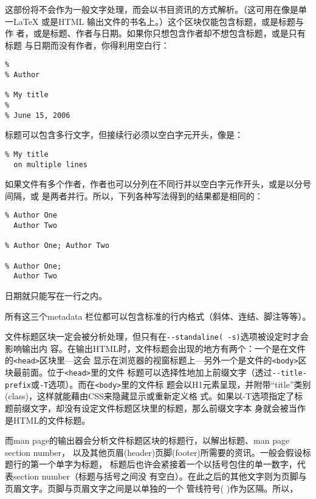\documentclass[cn]{elegantbook}
\newcommand{\passthrough}[1]{#1}
\begin{document}
这部份将不会作为一般文字处理，而会以书目资讯的方式解析。（这可用在像是单
一LaTeX 或是HTML 输出文件的书名上。）这个区块仅能包含标题，或是标题与作
者，或是标题、作者与日期。如果你只想包含作者却不想包含标题，或是只有标题
与日期而没有作者，你得利用空白行：

\begin{lstlisting}
%
% Author

% My title
%
% June 15, 2006
\end{lstlisting}

标题可以包含多行文字，但接续行必须以空白字元开头，像是：

\begin{lstlisting}
% My title
  on multiple lines
\end{lstlisting}

如果文件有多个作者，作者也可以分列在不同行并以空白字元作开头，或是以分号间隔，或
是两者并行。所以，下列各种写法得到的结果都是相同的：

\begin{lstlisting}
% Author One
  Author Two

% Author One; Author Two

% Author One;
  Author Two
\end{lstlisting}

日期就只能写在一行之内。

所有这三个metadata
栏位都可以包含标准的行内格式（斜体、连结、脚注等等）。

文件标题区块一定会被分析处理，但只有在\passthrough{\lstinline!--standaline( -s)!}选项被设定时才会影响输出内
容。在输出HTML时，文件标题会出现的地方有两个：一个是在文件的\passthrough{\lstinline!<head>!}区块里---这会
显示在浏览器的视窗标题上---另外一个是文件的\passthrough{\lstinline!<body>!}区块最前面。位于\passthrough{\lstinline!<head>!}里的文件
标题可以选择性地加上前缀文字（透过\passthrough{\lstinline!--title-prefix!}或\passthrough{\lstinline!-T!}选项）。而在\passthrough{\lstinline!<body>!}里的文件标
题会以H1元素呈现，并附带``title''类别(class)，这样就能藉由CSS来隐藏显示或重新定义格
式。如果以-T选项指定了标题前缀文字，却没有设定文件标题区块里的标题，那么前缀文字本
身就会被当作是HTML的文件标题。

而man page的输出器会分析文件标题区块的标题行，以解出标题、man page
section number，
以及其他页眉(header)页脚(footer)所需要的资讯。一般会假设标题行的第一个单字为标题，
标题后也许会紧接着一个以括号包住的单一数字，代表section
number（标题与括号之间没
有空白）。在此之后的其他文字则为页脚与页眉文字。页脚与页眉文字之间是以单独的一个
管线符号( \textbar)作为区隔。所以，
\end{document}
